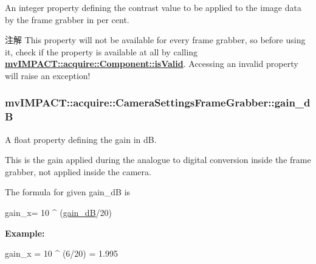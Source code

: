 An integer property defining the contrast value to be applied to the image data by the frame grabber in per cent. 

\begin{DoxyNote}{注解}
This property will not be available for every frame grabber, so before using it, check if the property is available at all by calling {\bfseries \hyperlink{classmv_i_m_p_a_c_t_1_1acquire_1_1_component_ac51e55e7e046101f3c6119d84123abd5}{mv\+I\+M\+P\+A\+C\+T\+::acquire\+::\+Component\+::is\+Valid}}. Accessing an invalid property will raise an exception! 
\end{DoxyNote}
\hypertarget{classmv_i_m_p_a_c_t_1_1acquire_1_1_camera_settings_frame_grabber_a53d9afd1f0e37c6af77840ee59e71dc2}{
\subsubsection[{gain\+\_\+d\+B}]{ mv\+I\+M\+P\+A\+C\+T\+::acquire\+::\+Camera\+Settings\+Frame\+Grabber\+::gain\+\_\+d\+B}}\label{classmv_i_m_p_a_c_t_1_1acquire_1_1_camera_settings_frame_grabber_a53d9afd1f0e37c6af77840ee59e71dc2}


A float property defining the gain in d\+B. 

This is the gain applied during the analogue to digital conversion inside the frame grabber, not applied inside the camera.


\begin{DoxyItemize}
\item The formula for given {\ttfamily gain\+\_\+d\+B} is 
\begin{DoxyCode}
gain\_x= 10 ^ (\hyperlink{classmv_i_m_p_a_c_t_1_1acquire_1_1_camera_settings_frame_grabber_a53d9afd1f0e37c6af77840ee59e71dc2}{gain\_dB}/20)
\end{DoxyCode}

\end{DoxyItemize}

{\bfseries Example\+:} 


\begin{DoxyCode}
gain\_x = 10 ^ (6/20) = 1.995
\end{DoxyCode}


